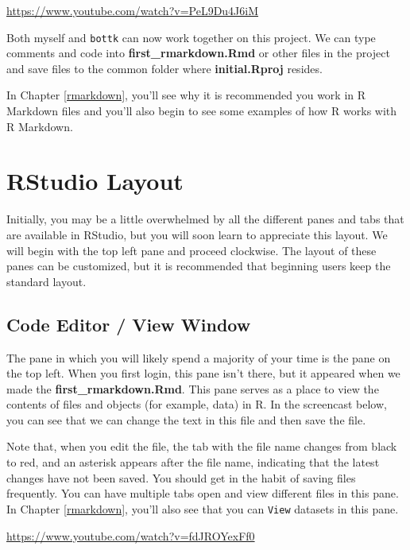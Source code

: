 \documentclass[]{tufte-book}
\begin{document}
\vspace{0.1in}\begin{center}\footnotesize{\url{https://www.youtube.com/watch?v=PeL9Du4J6iM}}\end{center}\vspace{0.1in}

Both myself and \texttt{bottk} can now work together on this project. We can type comments and code into \textbf{first\_rmarkdown.Rmd} or other files in the project and save files to the common folder where \textbf{initial.Rproj} resides.

In Chapter \ref{rmarkdown}, you'll see why it is recommended you work in R Markdown files and you'll also begin to see some examples of how R works with R Markdown.

\section{RStudio Layout}\label{rstudio-layout}

Initially, you may be a little overwhelmed by all the different panes and tabs that are available in RStudio, but you will soon learn to appreciate this layout. We will begin with the top left pane and proceed clockwise. The layout of these panes can be customized, but it is recommended that beginning users keep the standard layout.

\subsection{Code Editor / View Window}\label{code-editor-view-window}

The pane in which you will likely spend a majority of your time is the pane on the top left. When you first login, this pane isn't there, but it appeared when we made the \textbf{first\_rmarkdown.Rmd}. This pane serves as a place to view the contents of files and objects (for example, data) in R. In the screencast below, you can see that we can change the text in this file and then save the file.

Note that, when you edit the file, the tab with the file name changes from black to red, and an asterisk appears after the file name, indicating that the latest changes have not been saved. You should get in the habit of saving files frequently. You can have multiple tabs open and view different files in this pane. In Chapter \ref{rmarkdown}, you'll also see that you can \texttt{View} datasets in this pane.

\vspace{0.1in}\begin{center}\footnotesize{\url{https://www.youtube.com/watch?v=fdJROYexFf0}}\end{center}\vspace{0.1in}
\end{document}
